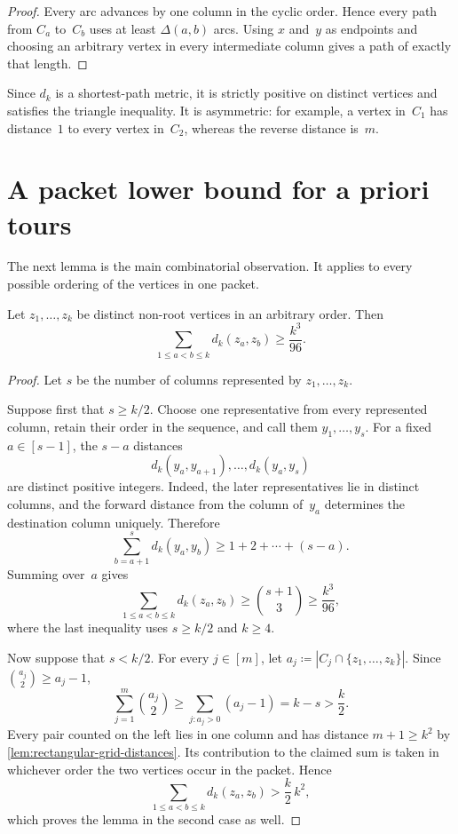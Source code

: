 \documentclass[12pt,a4paper,oneside]{report}
\begin{document}
\begin{proof}
Every arc advances by one column in the cyclic order.  Hence every path from
$C_a$ to~$C_b$ uses at least $\Delta(a,b)$ arcs.  Using $x$ and~$y$ as
endpoints and choosing an arbitrary vertex in every intermediate column gives
a path of exactly that length.
\end{proof}

Since $d_k$ is a shortest-path metric, it is strictly positive on distinct
vertices and satisfies the triangle inequality.  It is asymmetric: for
example, a vertex in~$C_1$ has distance~$1$ to every vertex in~$C_2$, whereas
the reverse distance is~$m$.

\section{A packet lower bound for a priori tours}
\label{sec:asym-adapt-prior}

The next lemma is the main combinatorial observation.  It applies to every
possible ordering of the vertices in one packet.

\begin{lemma}\label{lem:rectangular-grid-packet}
Let $z_1,\ldots,z_k$ be distinct non-root vertices in an arbitrary order.
Then
\[
    \sum_{1\le a<b\le k}d_k(z_a,z_b)
    \ge
    \frac{k^3}{96}.
\]
\end{lemma}

\begin{proof}
Let $s$ be the number of columns represented by $z_1,\ldots,z_k$.

Suppose first that $s\ge k/2$.  Choose one representative from every
represented column, retain their order in the sequence, and call them
$y_1,\ldots,y_s$.  For a fixed $a\in[s-1]$, the $s-a$ distances
\[
    d_k(y_a,y_{a+1}),\ldots,d_k(y_a,y_s)
\]
are distinct positive integers.  Indeed, the later representatives lie in
distinct columns, and the forward distance from the column of~$y_a$
determines the destination column uniquely.  Therefore
\[
    \sum_{b=a+1}^{s}d_k(y_a,y_b)
    \ge 1+2+\cdots+(s-a).
\]
Summing over~$a$ gives
\[
    \sum_{1\le a<b\le k}d_k(z_a,z_b)
    \ge
    \binom{s+1}{3}
    \ge
    \frac{k^3}{96},
\]
where the last inequality uses $s\ge k/2$ and $k\ge4$.

Now suppose that $s<k/2$.  For every $j\in[m]$, let
$a_j\coloneqq|C_j\cap\{z_1,\ldots,z_k\}|$.  Since
$\binom{a_j}{2}\ge a_j-1$,
\[
    \sum_{j=1}^{m}\binom{a_j}{2}
    \ge
    \sum_{j:a_j>0}(a_j-1)
    =k-s
    >\frac{k}{2}.
\]
Every pair counted on the left lies in one column and has distance
$m+1\ge k^2$ by \cref{lem:rectangular-grid-distances}.  Its contribution to
the claimed sum is taken in whichever order the two vertices occur in the
packet.  Hence
\[
    \sum_{1\le a<b\le k}d_k(z_a,z_b)
    >\frac{k}{2}\,k^2,
\]
which proves the lemma in the second case as well.
\end{proof}
\end{document}
